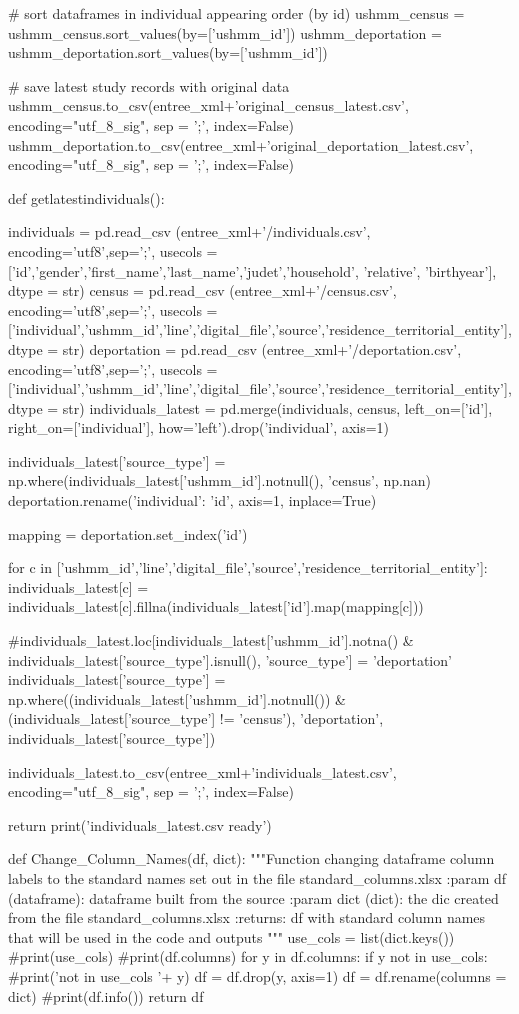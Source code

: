 \documentclass[a4paper,12pt,twoside]{book}
\begin{document}
\begin{python}
# sort dataframes in individual appearing order (by id)
ushmm_census = ushmm_census.sort_values(by=['ushmm_id'])
ushmm_deportation = ushmm_deportation.sort_values(by=['ushmm_id'])

# save latest study records with original data
ushmm_census.to_csv(entree_xml+'original_census_latest.csv', encoding="utf_8_sig", sep = ';', index=False)
ushmm_deportation.to_csv(entree_xml+'original_deportation_latest.csv', encoding="utf_8_sig", sep = ';', index=False)

def getlatestindividuals():

  individuals = pd.read_csv (entree_xml+'/individuals.csv', encoding='utf8',sep=';', usecols = ['id','gender','first_name','last_name','judet','household', 'relative', 'birthyear'],  dtype = str)
  census = pd.read_csv (entree_xml+'/census.csv', encoding='utf8',sep=';', usecols = ['individual','ushmm_id','line','digital_file','source','residence_territorial_entity'],  dtype = str)
  deportation = pd.read_csv (entree_xml+'/deportation.csv', encoding='utf8',sep=';', usecols = ['individual','ushmm_id','line','digital_file','source','residence_territorial_entity'], dtype = str)
  individuals_latest = pd.merge(individuals, census, left_on=['id'], right_on=['individual'], how='left').drop('individual', axis=1)
  
  individuals_latest['source_type'] = np.where(individuals_latest['ushmm_id'].notnull(), 'census', np.nan)
  deportation.rename({'individual': 'id'}, axis=1, inplace=True)
  
  mapping = deportation.set_index('id')

  for c in ['ushmm_id','line','digital_file','source','residence_territorial_entity']:
    individuals_latest[c] = individuals_latest[c].fillna(individuals_latest['id'].map(mapping[c]))
  
  #individuals_latest.loc[individuals_latest['ushmm_id'].notna() & individuals_latest['source_type'].isnull(), 'source_type'] = 'deportation'
  individuals_latest['source_type'] = np.where((individuals_latest['ushmm_id'].notnull()) & (individuals_latest['source_type'] != 'census'), 'deportation', individuals_latest['source_type'])
  
  individuals_latest.to_csv(entree_xml+'individuals_latest.csv', encoding="utf_8_sig", sep = ';', index=False)

  return print('individuals_latest.csv ready')
  
 
def Change_Column_Names(df, dict):
  """Function changing dataframe column labels to the standard names set out in the file standard_columns.xlsx
  :param df (dataframe): dataframe built from the source
  :param dict (dict): the dic created from the file standard_columns.xlsx
  :returns: df with standard column names that will be used in the code and outputs
  """
  use_cols = list(dict.keys())
  #print(use_cols)
  #print(df.columns)
  for y in df.columns:
    if y not in use_cols:
      #print('not in use_cols '+ y)
      df = df.drop(y, axis=1)
  df = df.rename(columns = dict)
  #print(df.info())
  return df
    

\end{python}
\end{document}
